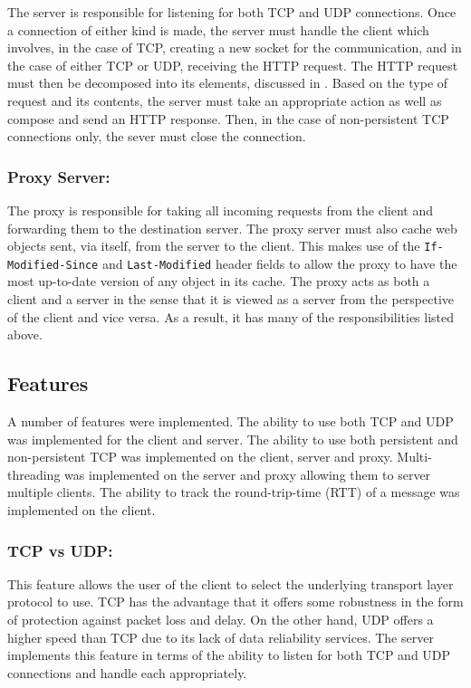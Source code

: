 \documentclass[10pt,twocolumn]{witseiepaper}
\begin{document}
	The server is responsible for listening for both TCP and UDP connections. Once a connection of either kind is made, the server must handle the client which involves, in the case of TCP, creating a new socket for the communication, and in the case of either TCP or UDP, receiving the HTTP request. The HTTP request must then be decomposed into its elements, discussed in . Based on the type of request and its contents, the server must take an appropriate action as well as compose and send an HTTP response. Then, in the case of non-persistent TCP connections only, the sever must close the connection.

	\subsubsection{Proxy Server:}

	The proxy is responsible for taking all incoming requests from the client and forwarding them to the destination server. The proxy server must also cache web objects sent, via itself, from the server to the client. This makes use of the \texttt{If-Modified-Since} and \texttt{Last-Modified} header fields to allow the proxy to have the most up-to-date version of any object in its cache. The proxy acts as both a client and a server in the sense that it is viewed as a server from the perspective of the client and vice versa. As a result, it has many of the responsibilities listed above.

\subsection{Features}

A number of features were implemented. The ability to use both TCP and UDP was implemented for the client and server. The ability to use both persistent and non-persistent TCP was implemented on the client, server and proxy. Multi-threading was implemented on the server and proxy allowing them to server multiple clients. The ability to track the round-trip-time (RTT) of a message was implemented on the client.

	\subsubsection{TCP vs UDP:}

	This feature allows the user of the client to select the underlying transport layer protocol to use. TCP has the advantage that it offers some robustness in the form of protection against packet loss and delay. On the other hand, UDP offers a higher speed than TCP due to its lack of data reliability services. The server implements this feature in terms of the ability to listen for both TCP and UDP connections and handle each appropriately. 
\end{document}

